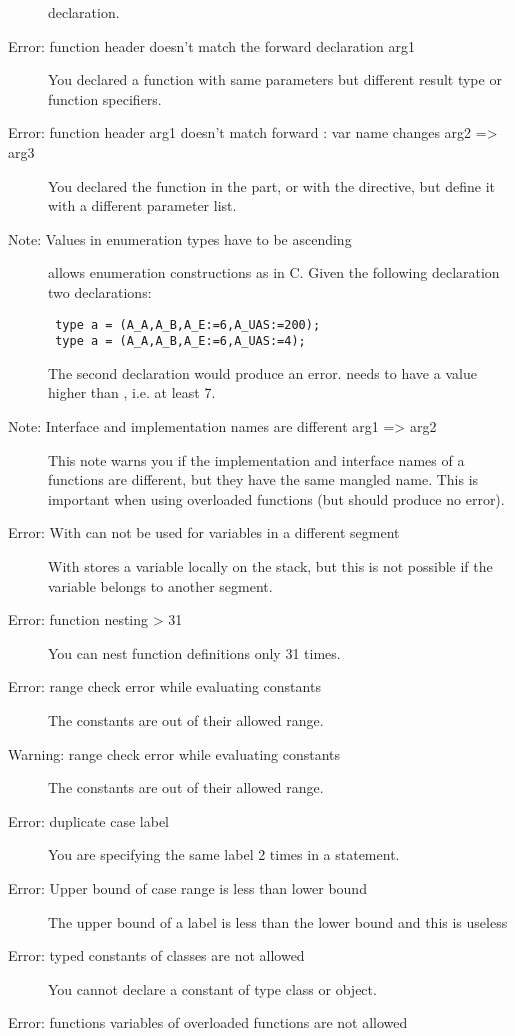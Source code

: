 \begin{description}
 declaration.
\item [Error: function header doesn't match the forward declaration arg1]
 You declared a function with same parameters but
 different result type or function specifiers.
\item [Error: function header arg1 doesn't match forward : var name changes arg2 => arg3]
 You declared the function in the  part, or with the
  directive, but define it with a different parameter list.
\item [Note: Values in enumeration types have to be ascending]
 \fpc allows enumeration constructions as in C. Given the following
 declaration two declarations:
 \begin{verbatim}
 type a = (A_A,A_B,A_E:=6,A_UAS:=200);
 type a = (A_A,A_B,A_E:=6,A_UAS:=4);
 \end{verbatim}
 The second declaration would produce an error.  needs to have a
 value higher than , i.e. at least 7.
\item [Note: Interface and implementation names are different arg1 => arg2]
 This note warns you if the implementation and interface names of a
 functions are different, but they have the same mangled name. This
 is important when using overloaded functions (but should produce no error).
\item [Error: With can not be used for variables in a different segment]
 With stores a variable locally on the stack,
 but this is not possible if the variable belongs to another segment.
\item [Error: function nesting > 31]
 You can nest function definitions only 31 times.
\item [Error: range check error while evaluating constants]
 The constants are out of their allowed range.
\item [Warning: range check error while evaluating constants]
 The constants are out of their allowed range.
\item [Error: duplicate case label]
 You are specifying the same label 2 times in a  statement.
\item [Error: Upper bound of case range is less than lower bound]
 The upper bound of a  label is less than the lower bound and this
 is useless
\item [Error: typed constants of classes are not allowed]
 You cannot declare a constant of type class or object.
\item [Error: functions variables of overloaded functions are not allowed]

\end{description}
